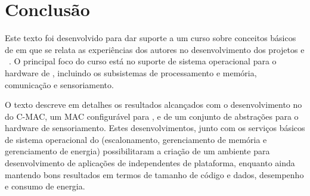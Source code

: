 \section{Conclusão}
\label{sec:conclusao}

Este texto foi desenvolvido para dar suporte a um curso sobre conceitos básicos
de \rssf em que se relata as experiências dos autores no desenvolvimento dos
projetos \epos e \emote~\cite{Project:EPOS:2010}. O principal foco do curso está
no suporte de sistema operacional para o hardware de \rssf, incluindo os
subsistemas de processamento e memória, comunicação e sensoriamento.

O texto descreve em detalhes os resultados alcançados com o desenvolvimento no
\epos do C-MAC, um MAC configurável para \rssf, e de um conjunto de abstrações
para o hardware de sensoriamento. Estes desenvolvimentos, junto com os serviços
básicos de sistema operacional do \epos (escalonamento, gerenciamento de memória
e gerenciamento de energia) possibilitaram a criação de um ambiente para
desenvolvimento de aplicações de \rssf independentes de plataforma, enquanto
ainda mantendo bons resultados em termos de tamanho de código e dados,
desempenho e consumo de energia.

